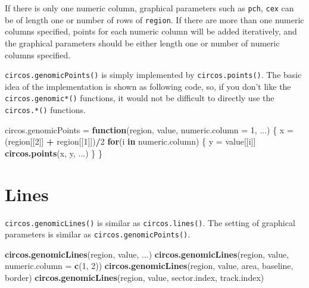 \documentclass[]{book}
\newenvironment{Shaded}{\begin{snugshade}}{\end{snugshade}}
\newcommand{\KeywordTok}[1]{\textcolor[rgb]{0.13,0.29,0.53}{\textbf{#1}}}
\newcommand{\DataTypeTok}[1]{\textcolor[rgb]{0.13,0.29,0.53}{#1}}
\newcommand{\DecValTok}[1]{\textcolor[rgb]{0.00,0.00,0.81}{#1}}
\newcommand{\StringTok}[1]{\textcolor[rgb]{0.31,0.60,0.02}{#1}}
\newcommand{\ControlFlowTok}[1]{\textcolor[rgb]{0.13,0.29,0.53}{\textbf{#1}}}
\newcommand{\OperatorTok}[1]{\textcolor[rgb]{0.81,0.36,0.00}{\textbf{#1}}}
\newcommand{\NormalTok}[1]{#1}
\theoremstyle{definition}
\theoremstyle{definition}
\theoremstyle{remark}
\begin{document}
If there is only one numeric column, graphical parameters such as
\texttt{pch}, \texttt{cex} can be of length one or number of rows of
\texttt{region}. If there are more than one numeric columns specified,
points for each numeric column will be added iteratively, and the
graphical parameters should be either length one or number of numeric
columns specified.

\texttt{circos.genomicPoints()} is simply implemented by
\texttt{circos.points()}. The basic idea of the implementation is shown
as following code, so, if you don't like the \texttt{circos.genomic*()}
functions, it would not be difficult to directly use the
\texttt{circos.*()} functions.

\begin{Shaded}
\begin{Highlighting}[]
\NormalTok{circos.genomicPoints =}\StringTok{ }\ControlFlowTok{function}\NormalTok{(region, value, }\DataTypeTok{numeric.column =} \DecValTok{1}\NormalTok{, ...) \{}
\NormalTok{    x =}\StringTok{ }\NormalTok{(region[[}\DecValTok{2}\NormalTok{]] }\OperatorTok{+}\StringTok{ }\NormalTok{region[[}\DecValTok{1}\NormalTok{]])}\OperatorTok{/}\DecValTok{2}
    \ControlFlowTok{for}\NormalTok{(i }\ControlFlowTok{in}\NormalTok{ numeric.column) \{}
\NormalTok{        y =}\StringTok{ }\NormalTok{value[[i]]}
        \KeywordTok{circos.points}\NormalTok{(x, y, ...)}
\NormalTok{    \}}
\NormalTok{\}}
\end{Highlighting}
\end{Shaded}

\section{Lines}\label{genomic-lines}

\texttt{circos.genomicLines()} is similar as \texttt{circos.lines()}.
The setting of graphical parameters is similar as
\texttt{circos.genomicPoints()}.

\begin{Shaded}
\begin{Highlighting}[]
\KeywordTok{circos.genomicLines}\NormalTok{(region, value, ...)}
\KeywordTok{circos.genomicLines}\NormalTok{(region, value, }\DataTypeTok{numeric.column =} \KeywordTok{c}\NormalTok{(}\DecValTok{1}\NormalTok{, }\DecValTok{2}\NormalTok{))}
\KeywordTok{circos.genomicLines}\NormalTok{(region, value, area, baseline, border)}
\KeywordTok{circos.genomicLines}\NormalTok{(region, value, sector.index, track.index)}
\end{Highlighting}
\end{Shaded}
\end{document}
